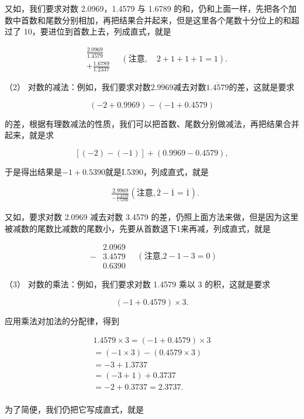 又如，我们要求对数 2.0969，1.4579 与 1.6789
的和，仍和上面一样，先把各个加数中首数和尾数分别相加，再把结果合并起来，但是这里各个尾数十分位上的和超过了
10，要进位到首数上去，列成直式，就是

\[
\begin{array}{rl} & \frac{2.0969}{1.4579} \\ & + \frac{1.6789}{1.2337} \end{array} \quad (\text{注意}, \quad 2 + 1 + 1 + 1 = 1).
\]

（2）
对数的减法：例如，我们要求对数\(\overline{2.9969}\)减去对数\(\overline{1.4579}\)的差，这就是要求

\[
(- 2 + 0.9969) - (- 1 + 0.4579)
\]

的差，根据有理数减法的性质，我们可以把首数、尾数分别做减法，再把结果合并起来，就是求

\[
[ (- 2) - (- 1) ] + (0.9969 - 0.4579),
\]

于是得出结果是\(-1 + 0.5390\)就是I.5390，列成直式，就是

\[
\begin{array}{rl} & \frac{2.9969}{- \frac{1.4579}{1.5390}} (\text{注意}, \overline {{2}} - \overline {{1}} = \overline {{1}}). \end{array}
\]

又如，要求对数 2.0969 减去对数 3.4579
的差，仍照上面方法来做，但是因为这里被减数的尾数比减数的尾数小，先要从首数退下1来再减，列成直式，就是

\[
\begin{array}{rl} & 2.0969 \\ - & 3.4579 \\ \hline {} & 0.6390 \end{array} \quad (\text{注意,} 2 - 1 - 3 = 0)
\]

（3） 对数的乘法：例如，我们要求对数 1.4579 乘以 3 的积，这就是要求

\[
(- 1 + 0.4579) \times 3.
\]

应用乘法对加法的分配律，得到

\[
\begin{array}{l} 1.4579 \times 3 = (- 1 + 0.4579) \times 3 \\ = (- 1 \times 3) - (0.4579 \times 3) \\ = - 3 + 1.3737 \\ = (- 3 + 1) + 0.3737 \\ = - 2 + 0.3737 = 2.3737. \\ \end{array}
\]

为了简便，我们仍把它写成直式，就是

